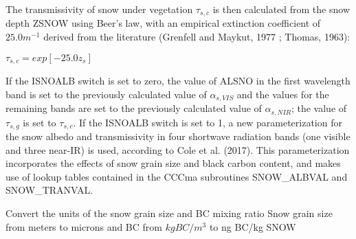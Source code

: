 The transmissivity of snow under vegetation $\tau_{s,c}$ is then calculated from the snow depth Z\+S\+N\+O\+W using Beer’s law, with an empirical extinction coefficient of $25.0 m^{-1}$ derived from the literature (Grenfell and Maykut, 1977 \cite{Grenfell1977-pi} ; Thomas, 1963)\+:

$\tau_{s,c} = exp[-25.0 z_s]$

If the I\+S\+N\+O\+A\+L\+B switch is set to zero, the value of A\+L\+S\+N\+O in the first wavelength band is set to the previously calculated value of $\alpha_{s,VIS}$ and the values for the remaining bands are set to the previously calculated value of $\alpha_{s,NIR}$; the value of $\tau_{s,g}$ is set to $\tau_{s,c}$. If the I\+S\+N\+O\+A\+L\+B switch is set to 1, a new parameterization for the snow albedo and transmissivity in four shortwave radiation bands (one visible and three near-\/\+I\+R) is used, according to Cole et al. (2017). This parameterization incorporates the effects of snow grain size and black carbon content, and makes use of lookup tables contained in the C\+C\+Cma subroutines S\+N\+O\+W\+\_\+\+A\+L\+B\+V\+A\+L and S\+N\+O\+W\+\_\+\+T\+R\+A\+N\+V\+A\+L.

Convert the units of the snow grain size and B\+C mixing ratio Snow grain size from meters to microns and B\+C from $kg BC/m^3$ to ng B\+C/kg S\+N\+O\+W